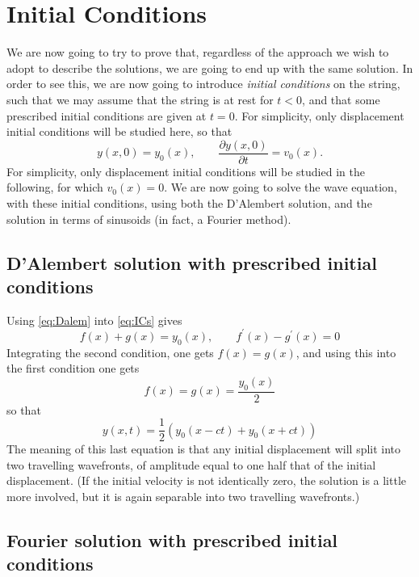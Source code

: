 \section{Initial Conditions}
We are now going to try to prove that, regardless of the approach we wish to adopt to describe the solutions, we are going to end up with the same solution. In order to see this, we are now going to introduce \emph{initial conditions} on the string, such that we may assume that the string is at rest for $t<0$, and that some prescribed initial conditions are given at $t=0$. For simplicity, only displacement initial conditions will be studied here, so that
\begin{equation}\label{eq:ICs}
y(x,0) = y_0(x), \qquad \frac{\partial y(x,0)}{\partial t} = v_0(x).
\end{equation}
For simplicity, only displacement initial conditions will be studied in the following, for which $v_0(x) = 0$. We are now going to solve the wave equation, with these initial conditions, using both the D'Alembert solution, and the solution in terms of sinusoids (in fact, a Fourier method). 


\subsection{D'Alembert solution with prescribed initial conditions}
Using \eqref{eq:Dalem} into \eqref{eq:ICs} gives
\begin{equation}
f(x)+g(x) = y_0(x), \qquad f^\prime(x) - g^\prime(x) = 0
\end{equation}
Integrating the second condition, one gets $f(x) = g(x)$, and using this into the first condition  one gets
\begin{equation}
f(x)=g(x)=\frac{y_0(x)}{2}
\end{equation}
so that
\begin{equation}\label{eq:Tr}
y(x,t) = \frac{1}{2}\left( y_0(x-ct) + y_0(x+ct)\right)
\end{equation}
The meaning of this last equation is that any initial displacement will split into two travelling wavefronts, of  amplitude equal to one half that of the initial displacement. (If the initial velocity is not identically zero, the solution is a little more involved, but it is again separable into two travelling wavefronts.)


\subsection{Fourier solution with prescribed initial conditions}


